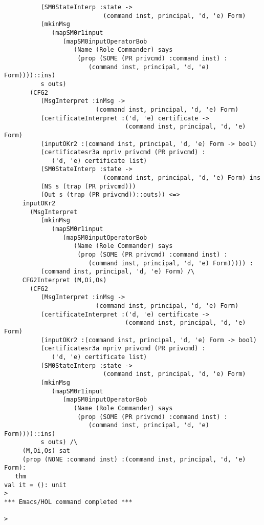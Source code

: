 \documentclass{report}
\begin{document}
\begin{session}
\begin{scriptsize}
\begin{verbatim}
          (SM0StateInterp :state ->
                           (command inst, principal, 'd, 'e) Form)
          (mkinMsg
             (mapSM0r1input
                (mapSM0inputOperatorBob
                   (Name (Role Commander) says
                    (prop (SOME (PR privcmd) :command inst) :
                       (command inst, principal, 'd, 'e) Form))))::ins)
          s outs)
       (CFG2
          (MsgInterpret :inMsg ->
                         (command inst, principal, 'd, 'e) Form)
          (certificateInterpret :('d, 'e) certificate ->
                                 (command inst, principal, 'd, 'e) Form)
          (inputOKr2 :(command inst, principal, 'd, 'e) Form -> bool)
          (certificatesr3a npriv privcmd (PR privcmd) :
             ('d, 'e) certificate list)
          (SM0StateInterp :state ->
                           (command inst, principal, 'd, 'e) Form) ins
          (NS s (trap (PR privcmd)))
          (Out s (trap (PR privcmd))::outs)) <=>
     inputOKr2
       (MsgInterpret
          (mkinMsg
             (mapSM0r1input
                (mapSM0inputOperatorBob
                   (Name (Role Commander) says
                    (prop (SOME (PR privcmd) :command inst) :
                       (command inst, principal, 'd, 'e) Form))))) :
          (command inst, principal, 'd, 'e) Form) /\
     CFG2Interpret (M,Oi,Os)
       (CFG2
          (MsgInterpret :inMsg ->
                         (command inst, principal, 'd, 'e) Form)
          (certificateInterpret :('d, 'e) certificate ->
                                 (command inst, principal, 'd, 'e) Form)
          (inputOKr2 :(command inst, principal, 'd, 'e) Form -> bool)
          (certificatesr3a npriv privcmd (PR privcmd) :
             ('d, 'e) certificate list)
          (SM0StateInterp :state ->
                           (command inst, principal, 'd, 'e) Form)
          (mkinMsg
             (mapSM0r1input
                (mapSM0inputOperatorBob
                   (Name (Role Commander) says
                    (prop (SOME (PR privcmd) :command inst) :
                       (command inst, principal, 'd, 'e) Form))))::ins)
          s outs) /\
     (M,Oi,Os) sat
     (prop (NONE :command inst) :(command inst, principal, 'd, 'e) Form):
   thm
val it = (): unit
> 
*** Emacs/HOL command completed ***

> 

\end{verbatim}
  \end{scriptsize}
\end{session}
\end{document}
